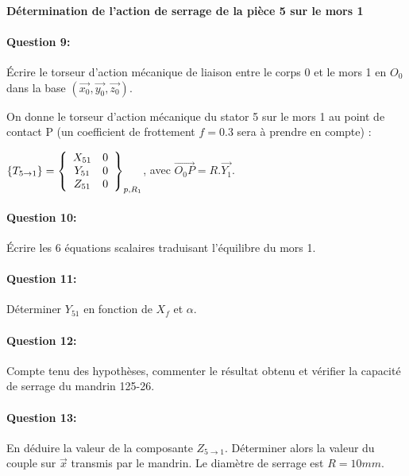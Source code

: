 ~\

\textbf{Détermination de l'action de serrage de la pièce 5 sur le mors 1}

\paragraph{Question 9:} Écrire le torseur d'action mécanique de liaison entre le corps 0 et le mors 1 en $O_0$ dans la base $(\overrightarrow{x_0},\overrightarrow{y_0},\overrightarrow{z_0})$. 

On donne le torseur d'action mécanique du stator 5 sur le mors 1 au point de contact P (un coefficient de frottement $f=0.3$ sera à prendre en compte) : 

$\left\{T_{5 \rightarrow 1}\right\}=\left\{
  \begin{array}{c c}
  X_{51} & 0 \\
  Y_{51} & 0 \\
  Z_{51} & 0
  \end{array}\right\}_{p,R_1}$, avec $\overrightarrow{O_0P}=R.\overrightarrow{Y_1}$.

\paragraph{Question 10:} Écrire les 6 équations scalaires traduisant l'équilibre du mors 1. 

\paragraph{Question 11:} Déterminer $Y_{51}$ en fonction de $X_f$ et $\alpha$. 

\paragraph{Question 12:} Compte tenu des hypothèses, commenter le résultat obtenu et vérifier la capacité de serrage du mandrin 125-26.

\paragraph{Question 13:} En déduire la valeur de la composante $Z_{5 \rightarrow 1}$. Déterminer alors la valeur du couple sur $\overrightarrow{x}$ transmis par le mandrin. Le diamètre de serrage est $R=10mm$.

